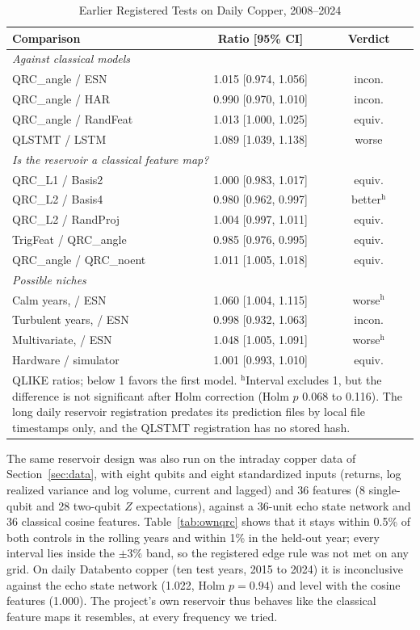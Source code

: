 \documentclass{ieeeaccess}
\begin{document}
\begin{table}[t]
\caption{Earlier Registered Tests on Daily Copper, 2008--2024}
\label{tab:earlier}
\centering
\begin{tabular}{lcc}
\hline
Comparison & Ratio [95\% CI] & Verdict \\
\hline
\multicolumn{3}{l}{\textit{Against classical models}} \\
QRC\_angle / ESN & 1.015 [0.974, 1.056] & incon. \\
QRC\_angle / HAR & 0.990 [0.970, 1.010] & incon. \\
QRC\_angle / RandFeat & 1.013 [1.000, 1.025] & equiv. \\
QLSTMT / LSTM & 1.089 [1.039, 1.138] & worse \\
\multicolumn{3}{l}{\textit{Is the reservoir a classical feature map?}} \\
QRC\_L1 / Basis2 & 1.000 [0.983, 1.017] & equiv. \\
QRC\_L2 / Basis4 & 0.980 [0.962, 0.997] & better$^\mathrm{h}$ \\
QRC\_L2 / RandProj & 1.004 [0.997, 1.011] & equiv. \\
TrigFeat / QRC\_angle & 0.985 [0.976, 0.995] & equiv. \\
QRC\_angle / QRC\_noent & 1.011 [1.005, 1.018] & equiv. \\
\multicolumn{3}{l}{\textit{Possible niches}} \\
Calm years, / ESN & 1.060 [1.004, 1.115] & worse$^\mathrm{h}$ \\
Turbulent years, / ESN & 0.998 [0.932, 1.063] & incon. \\
Multivariate, / ESN & 1.048 [1.005, 1.091] & worse$^\mathrm{h}$ \\
Hardware / simulator & 1.001 [0.993, 1.010] & equiv. \\
\hline
\multicolumn{3}{p{7.6cm}}{\footnotesize QLIKE ratios; below 1 favors the first model. $^\mathrm{h}$Interval excludes 1, but the difference is not significant after Holm correction (Holm $p$ 0.068 to 0.116). The long daily reservoir registration predates its prediction files by local file timestamps only, and the QLSTMT registration has no stored hash.}\\
\end{tabular}
\end{table}

The same reservoir design was also run on the intraday copper data of Section~\ref{sec:data}, with eight qubits and eight standardized inputs (returns, log realized variance and log volume, current and lagged) and 36 features (8 single-qubit and 28 two-qubit $Z$ expectations), against a 36-unit echo state network and 36 classical cosine features. Table~\ref{tab:ownqrc} shows that it stays within 0.5\% of both controls in the rolling years and within 1\% in the held-out year; every interval lies inside the $\pm3\%$ band, so the registered edge rule was not met on any grid. On daily Databento copper (ten test years, 2015 to 2024) it is inconclusive against the echo state network (1.022, Holm $p=0.94$) and level with the cosine features (1.000). The project's own reservoir thus behaves like the classical feature maps it resembles, at every frequency we tried.
\end{document}
